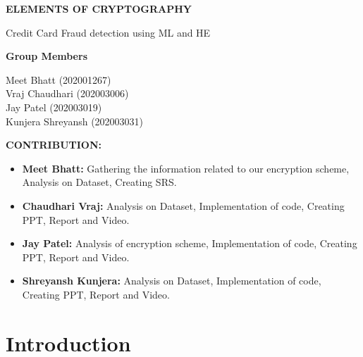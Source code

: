 \documentclass{article}
\begin{document}
\begin{titlepage}
   \begin{center}
       \vspace*{1cm}

       \textbf{\Large{ELEMENTS OF CRYPTOGRAPHY}}

       \vspace{0.5cm}
        \large{Credit Card Fraud detection using ML and HE}
            
       \vspace{1.5cm}

       

       \vfill
            
       \textbf{ Group Members}\\
            
       \vspace{0.8cm}
     
            
       Meet Bhatt (202001267)\\
       Vraj Chaudhari (202003006)\\
       Jay Patel (202003019)\\
       Kunjera Shreyansh (202003031)
            
   \end{center}
\end{titlepage}

\begin{center}
    \textbf{CONTRIBUTION:}
\end{center}

\begin{itemize}
    \item \textbf{Meet Bhatt:} Gathering the information related to our encryption scheme, Analysis on Dataset, Creating SRS.
    \item \textbf{Chaudhari Vraj:} Analysis on Dataset, Implementation of code, Creating PPT, Report and Video.
    \item \textbf{Jay Patel:} Analysis of encryption scheme, Implementation of code, Creating PPT, Report and Video.
    \item \textbf{Shreyansh Kunjera:} Analysis on Dataset, Implementation of code, Creating PPT, Report and Video.
\end{itemize}

\pagebreak

\section{Introduction}
\end{document}
